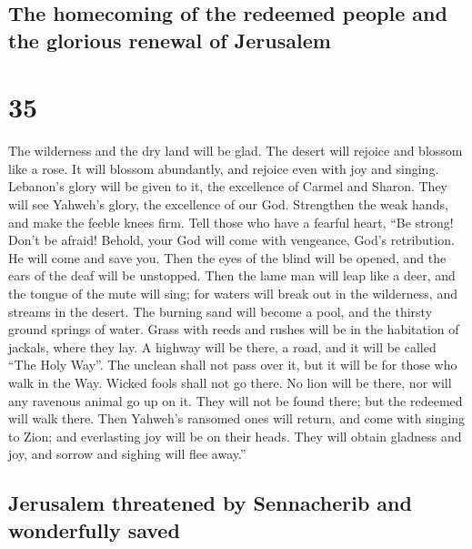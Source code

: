 \hypertarget{the-homecoming-of-the-redeemed-people-and-the-glorious-renewal-of-jerusalem}{%
\subsection{The homecoming of the redeemed people and the glorious
renewal of
Jerusalem}\label{the-homecoming-of-the-redeemed-people-and-the-glorious-renewal-of-jerusalem}}

\hypertarget{section-34}{%
\section{35}\label{section-34}}

 The wilderness and the dry land will be glad. The desert
will rejoice and blossom like a rose.  It will blossom
abundantly, and rejoice even with joy and singing. Lebanon's glory will
be given to it, the excellence of Carmel and Sharon. They will see
Yahweh's glory, the excellence of our God.  Strengthen the
weak hands, and make the feeble knees firm.  Tell those
who have a fearful heart, ``Be strong! Don't be afraid! Behold, your God
will come with vengeance, God's retribution. He will come and save you.
 Then the eyes of the blind will be opened, and the ears
of the deaf will be unstopped.  Then the lame man will
leap like a deer, and the tongue of the mute will sing; for waters will
break out in the wilderness, and streams in the desert. 
The burning sand will become a pool, and the thirsty ground springs of
water. Grass with reeds and rushes will be in the habitation of jackals,
where they lay.  A highway will be there, a road, and it
will be called ``The Holy Way''. The unclean shall not pass over it, but
it will be for those who walk in the Way. Wicked fools shall not go
there.  No lion will be there, nor will any ravenous
animal go up on it. They will not be found there; but the redeemed will
walk there.  Then Yahweh's ransomed ones will return, and
come with singing to Zion; and everlasting joy will be on their heads.
They will obtain gladness and joy, and sorrow and sighing will flee
away.''

\hypertarget{jerusalem-threatened-by-sennacherib-and-wonderfully-saved}{%
\subsection{Jerusalem threatened by Sennacherib and wonderfully
saved}\label{jerusalem-threatened-by-sennacherib-and-wonderfully-saved}}

